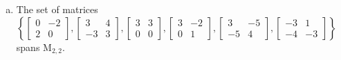 \begin{exerciseAnswer}
\begin{enumerate}[(a)]
\item The set of matrices \( \left\{ \left[\begin{array}{cc}
0 & -2 \\
2 & 0
\end{array}\right] , \left[\begin{array}{cc}
3 & 4 \\
-3 & 3
\end{array}\right] , \left[\begin{array}{cc}
3 & 3 \\
0 & 0
\end{array}\right] , \left[\begin{array}{cc}
3 & -2 \\
0 & 1
\end{array}\right] , \left[\begin{array}{cc}
3 & -5 \\
-5 & 4
\end{array}\right] , \left[\begin{array}{cc}
-3 & 1 \\
-4 & -3
\end{array}\right] \right\} \) spans \(\mathrm{M}_{2,2}\). 
\end{enumerate}
    
\end{exerciseAnswer}
    
